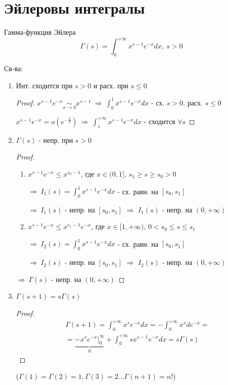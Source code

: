 \documentclass{article}
\theoremstyle{definition}
\numberwithin{theorem}{section}
\numberwithin{lemma}{section}
\numberwithin{definition}{section}
\numberwithin{corollary}{section}
\numberwithin{equation}{section}
\let\implies\Rightarrow
\begin{document}
\section{Эйлеровы интегралы}
\begin{definition}
  Гамма-функция Эйлера
  \[
    \Gamma(s)=\int_{0}^{+\infty}x^{s-1}e^{-x}dx, \ s>0
  \]
\end{definition}
Св-ва:
\begin{enumerate}
  \item Инт. сходится при $s>0$ и расх. при $s\le0$

    \begin{proof}
      \phantom{.}

      $x^{s-1}e^{-x} \underset{x\to 0}{\sim}x^{s-1} \ \implies \ \int_{0}^{1}x^{s-1}e^{-x}dx$ - сх. $s>0$, расх. $s\le0$

    $x^{s-1}e^{-x}=o(e^{-\frac{x}{2}}) \ \implies \ \int_{1}^{+\infty}x^{s-1}e^{-x}dx$ - сходится $\forall s$
    \end{proof}
  \item $\Gamma(s)$ - непр. при $s>0$

    \begin{proof}
      \phantom{.}

      \begin{enumerate}
        \item $x^{s-1}e^{-x}\le x ^{s_0-1}$, где $x\in (0,1]$, $s_1\ge s \ge s_0> 0$

          $\implies \ I_1(s)=\int_{0}^{1}x^{s-1}e^{-x}dx$ - сх. равн. на $[s_0,s_1]$

          $\implies \ I_1(s)$ - непр. на $[s_0,s_1]$ $\implies$ $I_1(s)$ - непр. на $(0,+\infty)$
        \item $x^{s-1}e^{-x}\le x^{s_1-1}e^{-x}$, где $x\in[1,+\infty)$, $0<s_0\le s \le s_1$

          $\implies \ I_2(s)=\int_{0}^{1}x^{s-1}e^{-x}dx$ - сх. равн. на $[s_0,s_1]$

          $\implies \ I_2(s)$ - непр. на $[s_0,s_1]$ $\implies$ $I_2(s)$ - непр. на $(0,+\infty)$
      \end{enumerate}
      $\implies \ \Gamma(s)$ - непр. на $(0,+\infty)$
    \end{proof}
  \item $\Gamma(s+1)=s\Gamma(s)$
    \begin{proof}
      \begin{gather*}
        \Gamma(s+1)=\int_{0}^{+\infty}x^{s}e^{-x}dx= -\int_{0}^{+\infty}x^{s}de^{-x} = \\
        =\underbrace{-x^{s}e^{-x}\big|_{0}^{\infty}}_{0}+\int_{0}^{+\infty}sx^{s-1}e^{-x}dx=s\Gamma(s)
      \end{gather*}
    \end{proof}
    ($\Gamma(1)=\Gamma(2)=1, \Gamma(3)=2\dots \Gamma(n+1)=n!$)
\end{enumerate}
\end{document}
